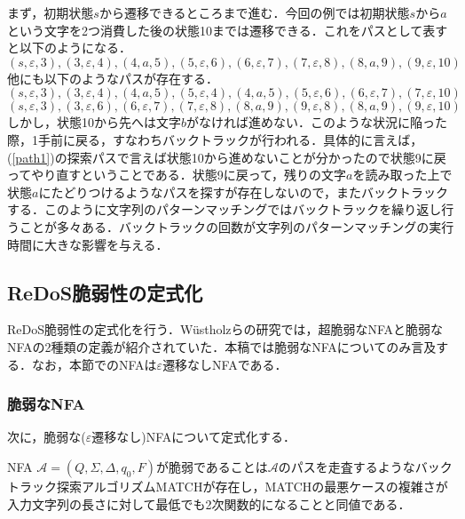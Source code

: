 \documentclass[a4paper, 12pt, dvipdfmx, uplatex]{jsreport}
\begin{document}
まず，初期状態$s$から遷移できるところまで進む．今回の例では初期状態$s$から$a$という文字を2つ消費した後の状態10までは遷移できる．これをパスとして表すと以下のようになる．
\begin{equation}
  (s,\varepsilon,3),(3,\varepsilon,4),(4,a,5),(5,\varepsilon,6),(6,\varepsilon,7),(7,\varepsilon,8),(8,a,9),(9,\varepsilon,10)\label{path1}
\end{equation}
他にも以下のようなパスが存在する．
\begin{equation*}
  (s,\varepsilon,3),(3,\varepsilon,4),(4,a,5),(5,\varepsilon,4),(4,a,5),(5,\varepsilon,6),(6,\varepsilon,7),(7,\varepsilon,10)
\end{equation*}
\begin{equation*}
  (s,\varepsilon,3),(3,\varepsilon,6),(6,\varepsilon,7),(7,\varepsilon,8),(8,a,9),(9,\varepsilon,8),(8,a,9),(9,\varepsilon,10)
\end{equation*}
しかし，状態10から先へは文字$b$がなければ進めない．このような状況に陥った際，1手前に戻る，すなわちバックトラックが行われる．具体的に言えば，(\ref{path1})の探索パスで言えば状態10から進めないことが分かったので状態9に戻ってやり直すということである．状態9に戻って，残りの文字$a$を読み取った上で状態$a$にたどりつけるようなパスを探すが存在しないので，またバックトラックする．このように文字列のパターンマッチングではバックトラックを繰り返し行うことが多々ある．バックトラックの回数が文字列のパターンマッチングの実行時間に大きな影響を与える．


\subsection{ReDoS脆弱性の定式化}
ReDoS脆弱性の定式化を行う．W\"{u}stholzらの研究\cite{vul_detect}では，超脆弱なNFAと脆弱なNFAの2種類の定義が紹介されていた．本稿では脆弱なNFAについてのみ言及する．なお，本節でのNFAは$\varepsilon$遷移なしNFAである．

\subsubsection{脆弱なNFA}
次に，脆弱な($\varepsilon$遷移なし)NFAについて定式化する．
\begin{dfn}[脆弱なNFA]
  NFA $\mathcal{A}=(Q,\Sigma,\Delta,q_0,F)$が脆弱であることは$\mathcal{A}$のパスを走査するようなバックトラック探索アルゴリズムMATCHが存在し，MATCHの最悪ケースの複雑さが入力文字列の長さに対して最低でも2次関数的になることと同値である．
\end{dfn}
\end{document}
